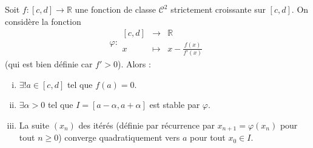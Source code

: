 






	\begin{theorem}
		Soit $f : [c, d] \rightarrow \mathbb{R}$ une fonction de classe $\mathcal{C}^2$ strictement croissante sur $[c, d]$. On considère la fonction
		\[ \varphi :
		\begin{array}{ccc}
			[c, d] &\rightarrow& \mathbb{R} \\
			x &\mapsto& x - \frac{f(x)}{f'(x)}
		\end{array}
		\]
		(qui est bien définie car $f' > 0$). Alors :
		\begin{enumerate}[(i)]
			\item $\exists! a \in [c, d]$ tel que $f(a) = 0$.
			\item $\exists \alpha > 0$ tel que $I = [a - \alpha, a + \alpha]$ est stable par $\varphi$.
			\item La suite $(x_n)$ des itérés (définie par récurrence par $x_{n+1} = \varphi(x_n)$ pour tout $n \geq 0$) converge quadratiquement vers $a$ pour tout $x_0 \in I$.
		\end{enumerate}
	\end{theorem}

